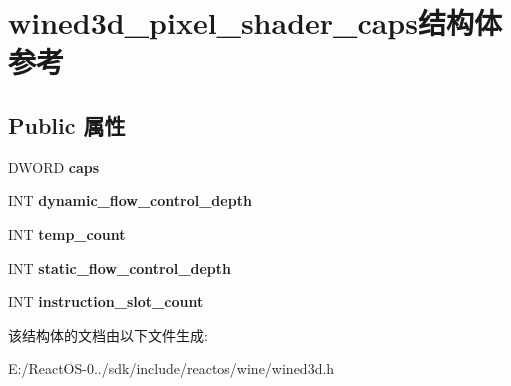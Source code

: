 \hypertarget{structwined3d__pixel__shader__caps}{}\section{wined3d\+\_\+pixel\+\_\+shader\+\_\+caps结构体 参考}
\label{structwined3d__pixel__shader__caps}
\subsection*{Public 属性}
\begin{DoxyCompactItemize}
\item 
\mbox{\label{structwined3d__pixel__shader__caps_a8378c282162c99b49757c98225c99add}} 
D\+W\+O\+RD {\bfseries caps}
\item 
\mbox{\label{structwined3d__pixel__shader__caps_aae07ac957418378a39bf97cb1e2b29e5}} 
I\+NT {\bfseries dynamic\+\_\+flow\+\_\+control\+\_\+depth}
\item 
\mbox{\label{structwined3d__pixel__shader__caps_a35f6a2ed2ea94ffa88a662d34e1f48ec}} 
I\+NT {\bfseries temp\+\_\+count}
\item 
\mbox{\label{structwined3d__pixel__shader__caps_a8a4f72c52d0a1ffefea6aa15acb2c36a}} 
I\+NT {\bfseries static\+\_\+flow\+\_\+control\+\_\+depth}
\item 
\mbox{\label{structwined3d__pixel__shader__caps_ab5f254fef40629ec13a734ffd49a01dc}} 
I\+NT {\bfseries instruction\+\_\+slot\+\_\+count}
\end{DoxyCompactItemize}


该结构体的文档由以下文件生成\+:\begin{DoxyCompactItemize}
\item 
E\+:/\+React\+O\+S-\/0../sdk/include/reactos/wine/wined3d.\+h\end{DoxyCompactItemize}
